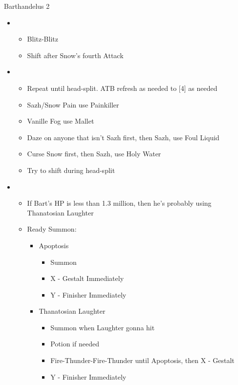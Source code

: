 \begin{battle}{Barthandelus 2}
\begin{multicols}{2}
\begin{itemize}
    \item \fourth
    \begin{itemize}
        \item Blitz-Blitz
        \item Shift after Snow's fourth Attack
    \end{itemize}
    \item \sixth
    \begin{itemize}
        \item Repeat until head-split. ATB refresh as needed to [4] as needed
        \item Sazh/Snow Pain use Painkiller
        \item Vanille Fog use Mallet
        \item Daze on anyone that isn't Sazh first, then Sazh, use Foul Liquid
        \item Curse Snow first, then Sazh, use Holy Water
        \item Try to shift during head-split
    \end{itemize}
    \item \fifth
    \begin{itemize}
        \item If Bart's HP is less than 1.3 million, then he's probably using Thanatosian Laughter
        \item Ready Summon:
        \begin{itemize}
            \item Apoptosis
            \begin{itemize}
                \item Summon
                \item X - Gestalt Immediately
                \item Y - Finisher Immediately
            \end{itemize}
            \item Thanatosian Laughter
            \begin{itemize}
                \item Summon when Laughter gonna hit
                \item Potion if needed
                \item Fire-Thunder-Fire-Thunder until Apoptosis, then X - Gestalt
                \item Y - Finisher Immediately
            \end{itemize}
        \end{itemize}
    \end{itemize}

\end{itemize}
\end{multicols}
\end{battle}
